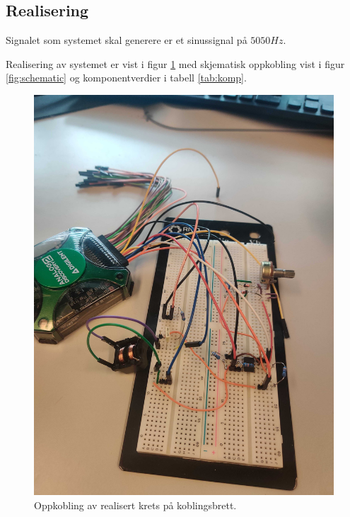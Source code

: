 \documentclass[a4paper,11pt,norsk]{article}
\begin{document}
\subsection{Realisering}
Signalet som systemet skal generere er et sinussignal på $5050Hz$.

Realisering av systemet er vist i figur \ref{fig:oppkobling} med skjematisk oppkobling vist i figur \ref{fig:schematic} og komponentverdier i tabell \ref{tab:komp}.

\begin{figure}[H]
  \centering
  \includegraphics[scale=0.085]{D1/Images/IMG_20220507_153928.jpg}
  \caption{Oppkobling av realisert krets på koblingsbrett.}
  \label{fig:oppkobling}
\end{figure}
\end{document}
